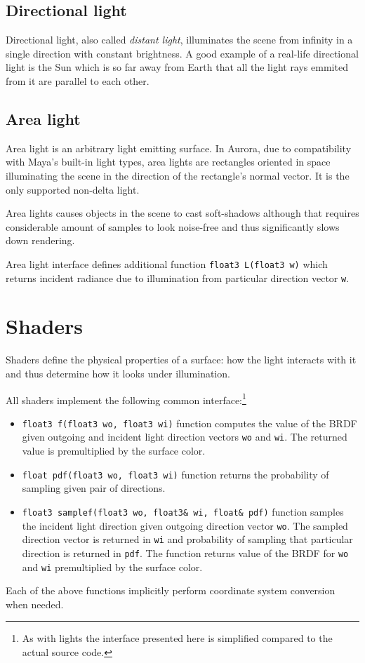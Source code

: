 \subsection{Directional light}
Directional light, also called \emph{distant light}, illuminates the scene from infinity in a single direction with constant brightness. A good example of a real-life directional light is the Sun which is so far away from Earth that all the light rays emmited from it are parallel to each other.

\subsection{Area light}
Area light is an arbitrary light emitting surface. In Aurora, due to compatibility with Maya's built-in light types, area lights are rectangles oriented in space illuminating the scene in the direction of the rectangle's normal vector. It is the only supported non-delta light. 

Area lights causes objects in the scene to cast soft-shadows although that requires considerable amount of samples to look noise-free and thus significantly slows down rendering.

Area light interface defines additional function \texttt{float3 L(float3 w)} which returns incident radiance due to illumination from particular direction vector \texttt{w}.

\section{Shaders}
Shaders define the physical properties of a surface: how the light interacts with it and thus determine how it looks under illumination.

All shaders implement the following common interface:\footnote{As with lights the interface presented here is simplified compared to the actual source code.}
\begin{itemize}
\item \texttt{float3 f(float3 wo, float3 wi)} function computes the value of the BRDF given outgoing and incident light direction vectors \texttt{wo} and \texttt{wi}. The returned value is premultiplied by the surface color.
\item \texttt{float pdf(float3 wo, float3 wi)} function returns the probability of sampling given pair of directions.
\item \texttt{float3 samplef(float3 wo, float3\& wi, float\& pdf)} function samples the incident light direction given outgoing direction vector \texttt{wo}. The sampled direction vector is returned in \texttt{wi} and probability of sampling that particular direction is returned in \texttt{pdf}. The function returns value of the BRDF for \texttt{wo} and \texttt{wi} premultiplied by the surface color.
\end{itemize}
Each of the above functions implicitly perform coordinate system conversion when needed.

